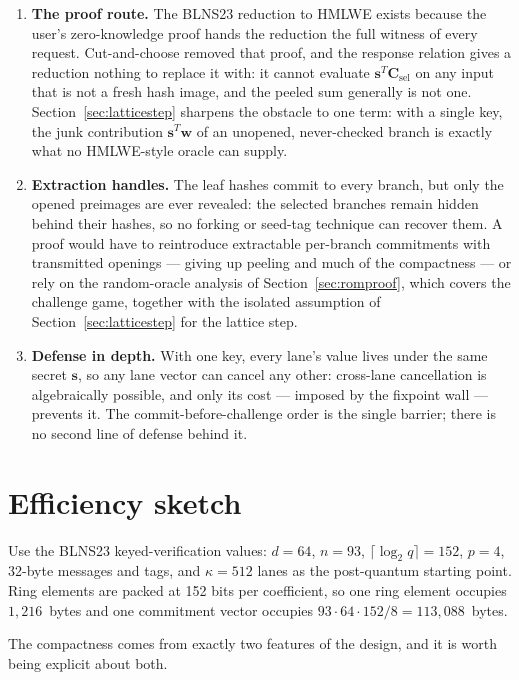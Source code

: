 \documentclass[11pt]{article}
\begin{document}
\begin{enumerate}
 \item \textbf{The proof route.}  The BLNS23 reduction to HMLWE exists because
the user's zero-knowledge proof hands the reduction the full witness of every
request.  Cut-and-choose removed that proof, and the response relation gives
a reduction nothing to replace it with: it cannot evaluate $\mathbf
s^{T}\mathbf C_{\mathrm{sel}}$ on any input that is not a fresh hash image,
and the peeled sum generally is not one.
Section~\ref{sec:latticestep} sharpens the obstacle to one term: with a
single key, the junk contribution $\mathbf s^{T}\mathbf w$ of an unopened,
never-checked branch is exactly what no HMLWE-style oracle can supply.
 \item \textbf{Extraction handles.}  The leaf hashes commit to every branch,
but only the opened preimages are ever revealed: the selected branches remain
hidden behind their hashes, so no forking or seed-tag technique can recover
them.  A proof would have to reintroduce extractable per-branch commitments
with transmitted openings --- giving up peeling and much of the compactness
--- or rely on the random-oracle analysis of Section~\ref{sec:romproof},
which covers the challenge game, together with the isolated assumption of
Section~\ref{sec:latticestep} for the lattice step.
 \item \textbf{Defense in depth.}  With one key, every lane's value lives
under the same secret $\mathbf s$, so any lane vector can cancel any other:
cross-lane cancellation is algebraically possible, and only its cost ---
imposed by the fixpoint wall --- prevents it.  The commit-before-challenge
order is the single barrier; there is no second line of defense behind it.
\end{enumerate}

\section{Efficiency sketch}
\label{sec:efficiency}

Use the BLNS23 keyed-verification values:
$d=64$, $n=93$, $\lceil\log_2 q\rceil=152$, $p=4$, 32-byte messages and tags,
and $\kappa=512$ lanes as the post-quantum starting point.  Ring elements are
packed at 152 bits per coefficient, so one ring element occupies
$1{,}216$~bytes and one commitment vector occupies
$93\cdot64\cdot152/8=113{,}088$~bytes.

The compactness comes from exactly two features of the design, and it is
worth being explicit about both.
\end{document}
